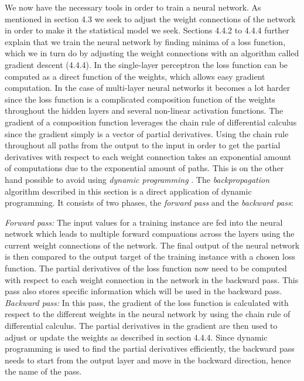 \documentclass[titlepage]{article}
\begin{document}
We now have the necessary tools in order to train a neural network. As mentioned in section 4.3 we seek to adjust the weight connections of the network in order to make it the statistical model we seek. Sections 4.4.2 to 4.4.4 further explain that we train the neural network by finding minima of a loss function, which we in turn do by adjusting the weight connections with an algorithm called gradient descent (4.4.4). In the single-layer perceptron the loss function can be computed as a direct function of the weights, which allows easy gradient computation. In the case of multi-layer neural networks it becomes a lot harder since the loss function is a complicated composition function of the weights throughout the hidden layers and several non-linear activation functions. The gradient of a composition function leverages the chain rule of differential calculus since the gradient simply is a vector of partial derivatives. Using the chain rule throughout all paths from the output to the input in order to get the partial derivatives with respect to each weight connection takes an exponential amount of computations due to the exponential amount of paths. This is on the other hand possible to avoid using \emph{dynamic programming} \cite{charu}. The \emph{backpropagation} algorithm \cite{charu} described in this section is a direct application of dynamic programming. It consists of two phases, the \emph{forward pass} and the \emph{backward pass}:

\begin{outline}
    \1 \emph{Forward pass:} The input values for a training instance are fed into the neural network which leads to multiple forward compuations across the layers using the current weight connections of the network. The final output of the neural network is then compared to the output target of the training instance with a chosen loss function. The partial derivatives of the loss function now need to be computed with respect to each weight connection in the network in the backward pass. This pass also stores specific information which will be used in the backward pass.
    \1 \emph{Backward pass:} In this pass, the gradient of the loss function is calculated with respect to the different weights in the neural network by using the chain rule of differential calculus. The partial derivatives in the gradient are then used to adjust or update the weights as described in section 4.4.4. Since dynamic programming is used to find the partial derivatives efficiently, the backward pass needs to start from the output layer and move in the backward direction, hence the name of the pass.
\end{outline}
\end{document}
